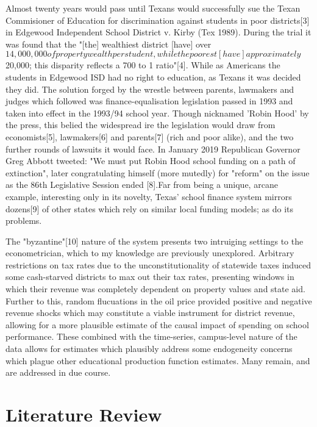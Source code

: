 \documentclass[11pt]{article}
\begin{document}
Almost twenty years would pass until Texans would successfully sue the Texan Commisioner of Education for discrimination against students in poor districts[3] in Edgewood Independent School District v. Kirby (Tex 1989). During the trial it was found that the "[the] wealthiest district [have] over $ 14,000,000 of property wealth per student, while the poorest [have] approximately $ 20,000; this disparity reflects a 700 to 1 ratio"[4]. While as Americans the students in Edgewood ISD had no right to education, as Texans it was decided they did. The solution forged by the wrestle between parents, lawmakers and judges which followed was finance-equalisation legislation passed in 1993 and taken into effect in the 1993/94 school year. Though nicknamed 'Robin Hood' by the press, this belied the widespread ire the legislation would draw from economists[5], lawmakers[6] and parents[7] (rich and poor alike), and the two further rounds of lawsuits it would face. In January 2019 Republican Governor Greg Abbott tweeted: "We must put Robin Hood school funding on a path of extinction", later congratulating himself (more mutedly) for "reform" on the issue as the 86th Legislative Session ended [8].Far from being a unique, arcane example, interesting only in its novelty, Texas' school finance system mirrors dozens[9] of other states which rely on similar local funding models; as do its problems. 

The "byzantine"[10] nature of the system presents two intruiging settings to the econometrician, which to my knowledge are previously unexplored. Arbitrary restrictions on tax rates due to the unconstitutionality of statewide taxes induced some cash-starved districts to max out their tax rates, presenting windows in which their revenue was completely dependent on property values and state aid. Further to this, random flucuations in the oil price provided positive and negative revenue shocks which may constitute a viable instrument for district revenue, allowing for a more plausible estimate of the causal impact of spending on school performance. These combined with the time-series, campus-level nature of the data allows for estimates which plausibly address some endogeneity concerns which plague other educational production function estimates. Many remain, and are addressed in due course. 


\section{Literature Review}
\label{s:next}
\end{document}
